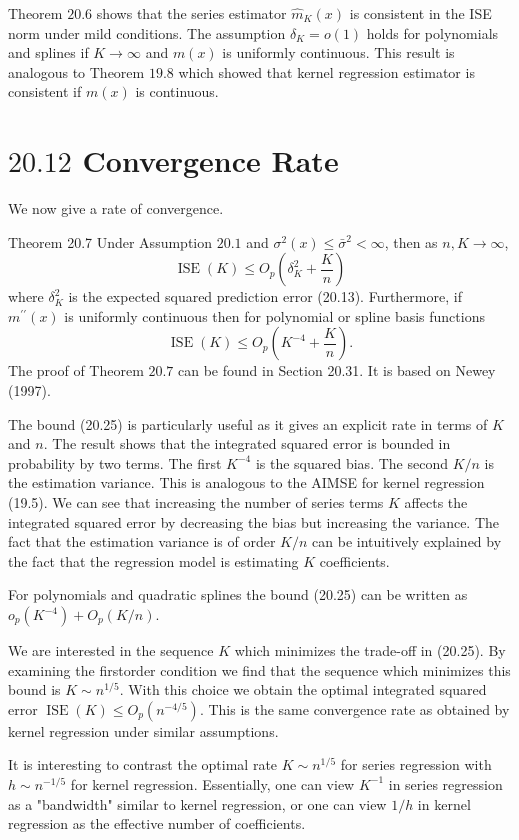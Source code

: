 \documentclass[10pt]{article}
\begin{document}
Theorem $20.6$ shows that the series estimator $\hat{m}_{K}(x)$ is consistent in the ISE norm under mild conditions. The assumption $\delta_{K}=o(1)$ holds for polynomials and splines if $K \rightarrow \infty$ and $m(x)$ is uniformly continuous. This result is analogous to Theorem $19.8$ which showed that kernel regression estimator is consistent if $m(x)$ is continuous.

\section{$20.12$ Convergence Rate}
We now give a rate of convergence.

Theorem 20.7 Under Assumption $20.1$ and $\sigma^{2}(x) \leq \bar{\sigma}^{2}<\infty$, then as $n, K \rightarrow \infty$,
$$
\operatorname{ISE}(K) \leq O_{p}\left(\delta_{K}^{2}+\frac{K}{n}\right)
$$
where $\delta_{K}^{2}$ is the expected squared prediction error (20.13). Furthermore, if $m^{\prime \prime}(x)$ is uniformly continuous then for polynomial or spline basis functions
$$
\operatorname{ISE}(K) \leq O_{p}\left(K^{-4}+\frac{K}{n}\right) .
$$
The proof of Theorem $20.7$ can be found in Section 20.31. It is based on Newey (1997).

The bound (20.25) is particularly useful as it gives an explicit rate in terms of $K$ and $n$. The result shows that the integrated squared error is bounded in probability by two terms. The first $K^{-4}$ is the squared bias. The second $K / n$ is the estimation variance. This is analogous to the AIMSE for kernel regression (19.5). We can see that increasing the number of series terms $K$ affects the integrated squared error by decreasing the bias but increasing the variance. The fact that the estimation variance is of order $K / n$ can be intuitively explained by the fact that the regression model is estimating $K$ coefficients.

For polynomials and quadratic splines the bound (20.25) can be written as $o_{p}\left(K^{-4}\right)+O_{p}(K / n)$.

We are interested in the sequence $K$ which minimizes the trade-off in (20.25). By examining the firstorder condition we find that the sequence which minimizes this bound is $K \sim n^{1 / 5}$. With this choice we obtain the optimal integrated squared error $\operatorname{ISE}(K) \leq O_{p}\left(n^{-4 / 5}\right)$. This is the same convergence rate as obtained by kernel regression under similar assumptions.

It is interesting to contrast the optimal rate $K \sim n^{1 / 5}$ for series regression with $h \sim n^{-1 / 5}$ for kernel regression. Essentially, one can view $K^{-1}$ in series regression as a "bandwidth" similar to kernel regression, or one can view $1 / h$ in kernel regression as the effective number of coefficients.
\end{document}
